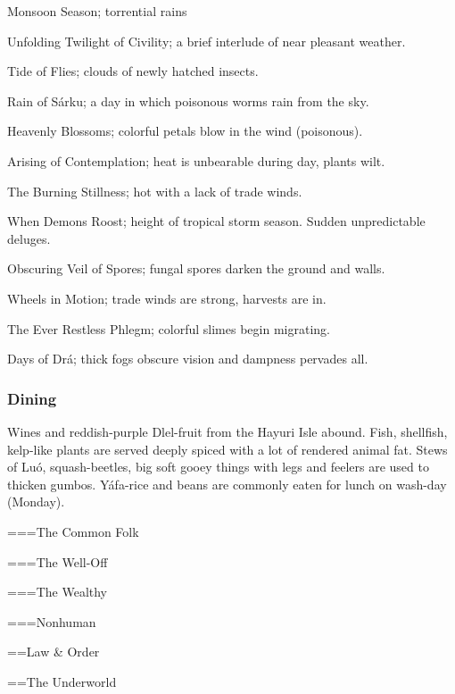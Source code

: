 \begin{description}[font=\sffamily\bfseries, leftmargin=1cm]
\item[Hasanpor] Monsoon Season; torrential rains
\item[Shapru]   Unfolding Twilight of Civility; a brief interlude of near pleasant weather.
\item[Didom]    Tide of Flies; clouds of newly hatched insects.
\item[Langala]  Rain of Sárku; a day in which poisonous worms rain from the sky.
\item[Fesru]    Heavenly Blossoms; colorful petals blow in the wind (poisonous).
\item[Drenggar] Arising of Contemplation; heat is unbearable during day, plants wilt.
\item[Firasul]  The Burning Stillness; hot with a lack of trade winds.
\item[Pardan]   When Demons Roost; height of tropical storm season. Sudden unpredictable deluges. 
\item[Halir]    Obscuring Veil of Spores; fungal spores darken the ground and walls.
\item[Trantor]  Wheels in Motion; trade winds are strong, harvests are in.
\item[Lesdrim]  The Ever Restless Phlegm; colorful slimes begin migrating.
\item[Dohala]   Days of Drá; thick fogs obscure vision and dampness pervades all.
\end{description}

\subsubsection{Dining}

Wines and reddish-purple Dlel-fruit from the Hayuri Isle abound. Fish, shellfish, kelp-like plants are served deeply spiced with a lot of rendered animal fat. Stews of  Luó, squash-beetles, big soft gooey things with legs and feelers are used to thicken gumbos. Yáfa-rice and beans are commonly eaten for lunch on wash-day (Monday). 



===The Common Folk

===The Well-Off

===The Wealthy

===Nonhuman

==Law \& Order

==The Underworld


